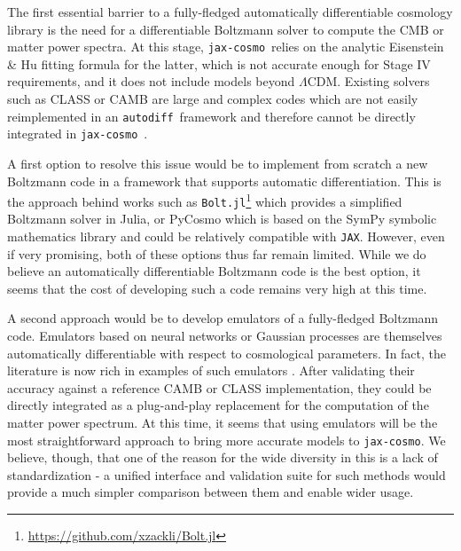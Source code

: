 \documentclass[twocolumn,twocolappendix,nofootinbib,iop]{openjournal}
\newcommand{\jaxcosmo}{\texttt{jax-cosmo}}
\newcommand{\autodiff}{\texttt{autodiff}}
\newcommand{\jax}{\texttt{JAX}}
\begin{document}
The first essential barrier to a fully-fledged automatically differentiable cosmology library is the need for a differentiable Boltzmann solver to compute the CMB or matter power spectra. At this stage, \jaxcosmo\ relies on the analytic Eisenstein \& Hu fitting formula for the latter, which is not accurate enough for Stage IV \citep{detf} requirements, and it does not include models beyond $\Lambda$CDM. Existing solvers such as CLASS \citep{2011JCAP...07..034B} or CAMB \citep{camb} are large and complex codes which are not easily reimplemented in an \autodiff\ framework and therefore cannot be directly integrated in \jaxcosmo\ .

A first option to resolve this issue would be to implement from scratch a new Boltzmann code in a framework that supports automatic differentiation. This is the approach behind works such as \texttt{Bolt.jl}\footnote{\url{https://github.com/xzackli/Bolt.jl}} which provides a simplified Boltzmann solver in Julia, or PyCosmo \citep{pycosmo} which is based on the SymPy symbolic mathematics library and could be relatively compatible with \jax. However, even if very promising, both of these options thus far remain limited. While we do believe an automatically differentiable Boltzmann code is the best option, it seems that the cost of developing such a code remains very high at this time.

A second approach would be to develop emulators of a fully-fledged Boltzmann code. Emulators based on neural networks or Gaussian processes are themselves automatically differentiable with respect to cosmological parameters. In fact, the literature is now rich in examples of such emulators \citep[e.g.][and references therein]{bacco1, bacco2, Gunther_2022, nygaard,cosmopower,cosmicnet, emucmb}. After validating their accuracy against a reference CAMB or CLASS implementation, they could be directly integrated as a plug-and-play replacement for the computation of the matter power spectrum. At this time, it seems that using emulators will be the most straightforward approach to bring more accurate models to \jaxcosmo. We believe, though,  that one of the reason for the wide diversity in this is a lack of standardization - a unified interface and validation suite for such methods would provide a much simpler comparison between them and enable wider usage.

\bigskip
\end{document}
